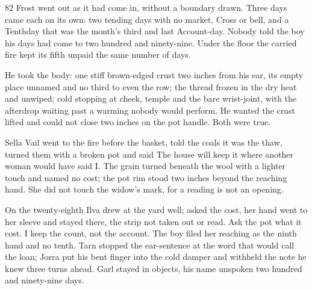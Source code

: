 
\scenebreak


\scenebreak


\scenebreak

\CRtailpiece
\begin{CRchronicle}{82}
Frost went out as it had come in, without a boundary drawn. Three days came each on its own: two tending days with no market, Cross or bell, and a Tenthday that was the month’s third and last Account-day. Nobody told the boy his days had come to two hundred and ninety-nine. Under the floor the carried fire kept its fifth unpaid the same number of days.

He took the body: one stiff brown-edged crust two inches from his ear, its empty place unnamed and no third to even the row; the thread frozen in the dry heat and unwiped; cold stopping at cheek, temple and the bare wrist-joint, with the afterdrop waiting past a warming nobody would perform. He wanted the crust lifted and could not close two inches on the pot handle. Both were true.

Sella Vail went to the fire before the basket, told the coals it was the thaw, turned them with a broken pot and said The house will keep it where another woman would have said I. The grain turned beneath the wool with a lighter touch and named no cost; the pot rim stood two inches beyond the reaching hand. She did not touch the widow’s mark, for a reading is not an opening.

On the twenty-eighth Ilva drew at the yard well; asked the cost, her hand went to her sleeve and stayed there, the strip not taken out or read. Ask the pot what it cost. I keep the count, not the account. The boy filed her reaching as the ninth hand and no tenth. Tarn stopped the ear-sentence at the word that would call the loan; Jorra put his bent finger into the cold damper and withheld the note he knew three turns ahead. Garl stayed in objects, his name unspoken two hundred and ninety-nine days.


\end{CRchronicle}
